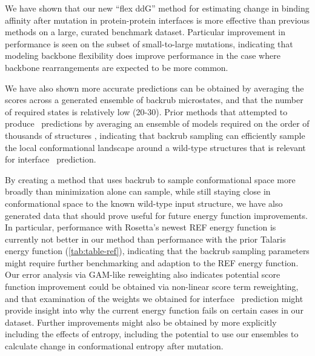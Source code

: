 We have shown that our new ``flex ddG'' method for estimating change in binding affinity after mutation in protein-protein interfaces is more effective than previous methods on a large, curated benchmark dataset.
Particular improvement in performance is seen on the subset of small-to-large mutations, indicating that modeling backbone flexibility does improve performance in the case where backbone rearrangements are expected to be more common.

We have also shown more accurate predictions can be obtained by averaging the scores across a generated ensemble of backrub microstates, and that the number of required states is relatively low (20-30).
Prior methods that attempted to produce \ddg\ predictions by averaging an ensemble of models required on the order of thousands of structures  \cite{benedix_predicting_2009}, indicating that backrub sampling can efficiently sample the local conformational landscape around a wild-type structures that is relevant for interface \ddg\ prediction.

By creating a method that uses backrub to sample conformational space more broadly than minimization alone can sample, while still staying close in conformational space to the known wild-type input structure, we have also generated data that should prove useful for future energy function improvements.
In particular, performance with Rosetta's newest REF energy function\cite{alford_rosetta_2017} is currently not better in our method than performance with the prior Talaris energy function (\cref{tab:table-ref}), indicating that the backrub sampling parameters might require further benchmarking and adaption to the REF energy function.
Our error analysis via GAM-like reweighting also indicates potential score function improvement could be obtained via non-linear score term reweighting, and that examination of the weights we obtained for interface \ddg\ prediction might provide insight into why the current energy function fails on certain cases in our dataset.
Further improvements might also be obtained by more explicitly including the effects of entropy, including the potential to use our ensembles to calculate change in conformational entropy after mutation.


